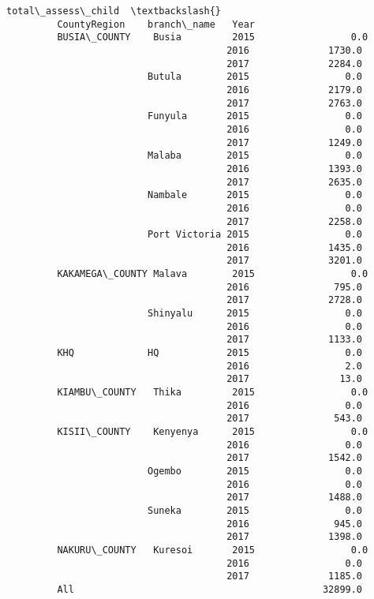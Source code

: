 \documentclass[11pt]{article}
\begin{document}
\begin{Verbatim}[commandchars=\\\{\}]
                                             total\_assess\_child  \textbackslash{}
         CountyRegion    branch\_name   Year                       
         BUSIA\_COUNTY    Busia         2015                 0.0   
                                       2016              1730.0   
                                       2017              2284.0   
                         Butula        2015                 0.0   
                                       2016              2179.0   
                                       2017              2763.0   
                         Funyula       2015                 0.0   
                                       2016                 0.0   
                                       2017              1249.0   
                         Malaba        2015                 0.0   
                                       2016              1393.0   
                                       2017              2635.0   
                         Nambale       2015                 0.0   
                                       2016                 0.0   
                                       2017              2258.0   
                         Port Victoria 2015                 0.0   
                                       2016              1435.0   
                                       2017              3201.0   
         KAKAMEGA\_COUNTY Malava        2015                 0.0   
                                       2016               795.0   
                                       2017              2728.0   
                         Shinyalu      2015                 0.0   
                                       2016                 0.0   
                                       2017              1133.0   
         KHQ             HQ            2015                 0.0   
                                       2016                 2.0   
                                       2017                13.0   
         KIAMBU\_COUNTY   Thika         2015                 0.0   
                                       2016                 0.0   
                                       2017               543.0   
         KISII\_COUNTY    Kenyenya      2015                 0.0   
                                       2016                 0.0   
                                       2017              1542.0   
                         Ogembo        2015                 0.0   
                                       2016                 0.0   
                                       2017              1488.0   
                         Suneka        2015                 0.0   
                                       2016               945.0   
                                       2017              1398.0   
         NAKURU\_COUNTY   Kuresoi       2015                 0.0   
                                       2016                 0.0   
                                       2017              1185.0   
         All                                            32899.0   
         

\end{Verbatim}
\end{document}
